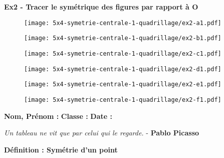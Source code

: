 \newpage 

\textbf{Ex2 - Tracer le symétrique des figures par rapport à O}

\begin{multicols}{2}
  
  \begin{figure}[H]
    \centering
    \texttt{[image: 5x4-symetrie-centrale-1-quadrillage/ex2-a1.pdf]}
  \end{figure}
  
  \begin{figure}[H]
    \centering
    \texttt{[image: 5x4-symetrie-centrale-1-quadrillage/ex2-b1.pdf]}
  \end{figure}
  
  \begin{figure}[H]
    \centering
    \texttt{[image: 5x4-symetrie-centrale-1-quadrillage/ex2-c1.pdf]}
  \end{figure}
  
  \begin{figure}[H]
    \centering
    \texttt{[image: 5x4-symetrie-centrale-1-quadrillage/ex2-d1.pdf]}
  \end{figure}
  
  \end{multicols}

  \begin{figure}[H]
    \centering
    \texttt{[image: 5x4-symetrie-centrale-1-quadrillage/ex2-e1.pdf]}
  \end{figure}

  \begin{figure}[H]
    \centering
    \texttt{[image: 5x4-symetrie-centrale-1-quadrillage/ex2-f1.pdf]}
  \end{figure}
  

\newpage


\textbf{Nom, Prénom :} \hspace{8cm} \textbf{Classe :} \hspace{3cm} \textbf{Date :}\\

\begin{center}
  \textit{Un tableau ne vit que par celui qui le regarde.} - \textbf{Pablo Picasso}
\end{center}

\textbf{Définition : Symétrie d'un point} \\ \Pointilles[3]

